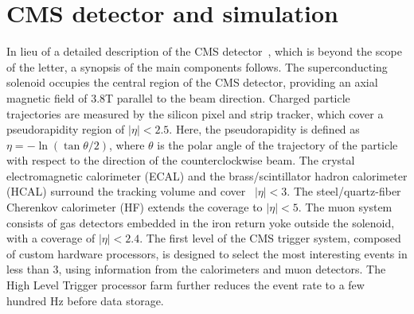 \documentclass[11pt,twoside,a4paper,cmspaper,final,collab]{cms-tdr}
\begin{document}
\section{CMS detector and simulation}
\label{sec:cms}
In lieu of a detailed description of the CMS detector~\cite{CMSdetector},
which is beyond the scope of the letter, a synopsis of the main components follows.
The superconducting solenoid occupies the
central region of the CMS detector, providing an axial magnetic
field of 3.8\unit{T} parallel to the beam direction. Charged particle trajectories
are measured by the silicon pixel and strip tracker, which cover a
pseudorapidity region of $|\eta| < 2.5$. Here, the pseudorapidity is defined as
$\eta=-\ln{(\tan{\theta/2})}$, where $\theta$ is the polar angle of the trajectory of the particle
with respect to the direction of the counterclockwise beam. The crystal electromagnetic
calorimeter (ECAL) and the brass/scintillator hadron calorimeter (HCAL)
surround the tracking volume and cover \mbox{ $|\eta| < 3$}. The steel/quartz-fiber
Cherenkov calorimeter (HF) extends the coverage to $|\eta| < 5$. The muon system consists of
gas detectors embedded in the iron return yoke outside the solenoid, with a coverage of $|\eta| < 2.4$.
The first level of the CMS trigger system, composed of custom
hardware processors, is designed to select the most interesting events
in less than 3\mus, using information from the calorimeters and muon
detectors. The High Level Trigger processor farm further
reduces the event rate to a few hundred Hz before data storage.
\end{document}
